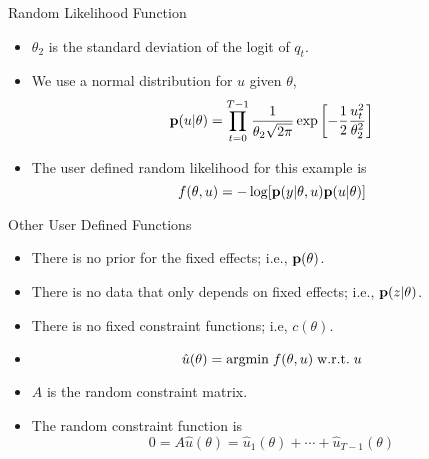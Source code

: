 \documentclass{beamer}
\newcommand{\B}[1]{{\bf #1}}
\newcommand{\R}[1]{{\rm #1}}
\begin{document}
\begin{frame}{Random Likelihood Function}
\begin{itemize}

\item
$\theta_2$ is the standard deviation of the logit of $q_t$.
\pause

\item
We use a normal distribution for $u$ given $\theta$,
\[
\B{p} ( u | \theta )
=
\prod_{t=0}^{T-1}
	\frac{1}{ \theta_2 \sqrt{ 2 \pi } }
		\exp \left[ - \frac{1}{2} \frac{ u_t^2 }{ \theta_2^2 } \right]
\]
\pause

\item
The user defined random likelihood for this example is
\[
f( \theta , u )
=
- \log [ \B{p} ( y | \theta , u) \B{p} ( u | \theta ) ]
\]

\end{itemize}
\end{frame}
\begin{frame}{Other User Defined Functions}
\begin{itemize}

\item
There is no prior for the fixed effects; i.e.,
$\B{p}( \theta )$.
\pause

\item
There is no data that only depends on fixed effects; i.e.,
$\B{p}(z| \theta )$.
\pause

\item
There is no fixed constraint functions; i.e,
$c( \theta )$.
\pause

\item
\[
\hat{u} ( \theta ) = \R{argmin} \; f( \theta , u ) \; \R{w.r.t.} \; u
\]
\pause

\item
$A$ is the random constraint matrix.

\item
The random constraint function is
\[
0
=
A \hat{u} ( \theta )
=
\hat{u}_1 ( \theta ) + \cdots + \hat{u}_{T-1} ( \theta )
\]

\end{itemize}
\end{frame}
\end{document}
